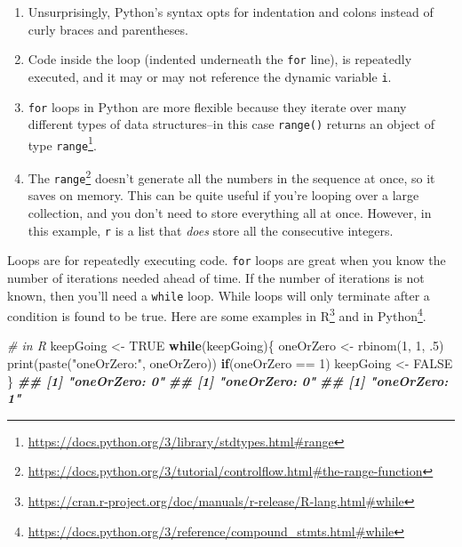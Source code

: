 \documentclass[
  12pt,
  krantz2]{krantz}
\makeatletter
\newenvironment{Shaded}{\begin{snugshade}}{\end{snugshade}}
\newcommand{\CommentTok}[1]{\textcolor[rgb]{0.37,0.37,0.37}{\textit{#1}}}
\newcommand{\ConstantTok}[1]{\textcolor[rgb]{0,0,0}{#1}}
\newcommand{\ControlFlowTok}[1]{\textcolor[rgb]{0.27,0.27,0.27}{\textbf{#1}}}
\newcommand{\DecValTok}[1]{\textcolor[rgb]{0.06,0.06,0.06}{#1}}
\newcommand{\DocumentationTok}[1]{\textcolor[rgb]{0.37,0.37,0.37}{\textbf{\textit{#1}}}}
\newcommand{\FunctionTok}[1]{\textcolor[rgb]{0,0,0}{#1}}
\newcommand{\NormalTok}[1]{#1}
\newcommand{\OtherTok}[1]{\textcolor[rgb]{0.37,0.37,0.37}{#1}}
\newcommand{\SpecialCharTok}[1]{\textcolor[rgb]{0,0,0}{#1}}
\newcommand{\StringTok}[1]{\textcolor[rgb]{0.5,0.5,0.5}{#1}}
\providecommand{\tightlist}{%
  \setlength{\itemsep}{0pt}\setlength{\parskip}{0pt}}
\renewcommand{\href}[2]{#2\footnote{\url{#1}}}
\newenvironment{kframe}{%
\medskip{}
\setlength{\fboxsep}{.8em}
 \def\at@end@of@kframe{}%
 \ifinner\ifhmode%
  \def\at@end@of@kframe{\end{minipage}}%
  \begin{minipage}{\columnwidth}%
 \fi\fi%
 \def\FrameCommand##1{\hskip\@totalleftmargin \hskip-\fboxsep
 \colorbox{shadecolor}{##1}\hskip-\fboxsep
     \hskip-\linewidth \hskip-\@totalleftmargin \hskip\columnwidth}%
 \MakeFramed {\advance\hsize-\width
   \@totalleftmargin\z@ \linewidth\hsize
   \@setminipage}}%
 {\par\unskip\endMakeFramed%
 \at@end@of@kframe}
\renewenvironment{Shaded}{\begin{kframe}}{\end{kframe}}
\makeatother
\begin{document}
\begin{enumerate}
\def\labelenumi{\arabic{enumi}.}
\tightlist
\item
  Unsurprisingly, Python's syntax opts for indentation and colons instead of curly braces and parentheses.
\item
  Code inside the loop (indented underneath the \texttt{for} line), is repeatedly executed, and it may or may not reference the dynamic variable \texttt{i}.
\item
  \texttt{for} loops in Python are more flexible because they iterate over many different types of data structures--in this case \href{https://docs.python.org/3/library/stdtypes.html\#range}{\texttt{range()} returns an object of type \texttt{range}}.
\item
  The \href{https://docs.python.org/3/tutorial/controlflow.html\#the-range-function}{\texttt{range}} doesn't generate all the numbers in the sequence at once, so it saves on memory. This can be quite useful if you're looping over a large collection, and you don't need to store everything all at once. However, in this example, \texttt{r} is a list that \emph{does} store all the consecutive integers.
\end{enumerate}

Loops are for repeatedly executing code. \texttt{for} loops are great when you know the number of iterations needed ahead of time. If the number of iterations is not known, then you'll need a \texttt{while} loop. While loops will only terminate after a condition is found to be true. Here are some examples \href{https://cran.r-project.org/doc/manuals/r-release/R-lang.html\#while}{in R} and \href{https://docs.python.org/3/reference/compound_stmts.html\#while}{in Python}.

\begin{Shaded}
\begin{Highlighting}[]
\CommentTok{\# in R}
\NormalTok{keepGoing }\OtherTok{\textless{}{-}} \ConstantTok{TRUE}
\ControlFlowTok{while}\NormalTok{(keepGoing)\{}
\NormalTok{    oneOrZero }\OtherTok{\textless{}{-}} \FunctionTok{rbinom}\NormalTok{(}\DecValTok{1}\NormalTok{, }\DecValTok{1}\NormalTok{, .}\DecValTok{5}\NormalTok{)}
    \FunctionTok{print}\NormalTok{(}\FunctionTok{paste}\NormalTok{(}\StringTok{"oneOrZero:"}\NormalTok{, oneOrZero))}
    \ControlFlowTok{if}\NormalTok{(oneOrZero }\SpecialCharTok{==} \DecValTok{1}\NormalTok{)}
\NormalTok{        keepGoing }\OtherTok{\textless{}{-}} \ConstantTok{FALSE}
\NormalTok{\}}
\DocumentationTok{\#\# [1] "oneOrZero: 0"}
\DocumentationTok{\#\# [1] "oneOrZero: 0"}
\DocumentationTok{\#\# [1] "oneOrZero: 1"}
\end{Highlighting}
\end{Shaded}
\end{document}
